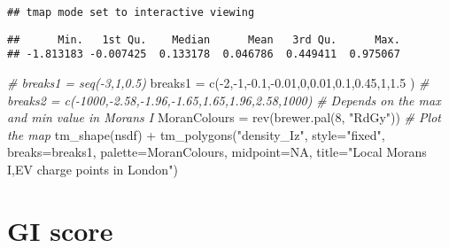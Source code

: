\documentclass[
]{book}
\newenvironment{Shaded}{\begin{snugshade}}{\end{snugshade}}
\newcommand{\AttributeTok}[1]{\textcolor[rgb]{0.77,0.63,0.00}{#1}}
\newcommand{\CommentTok}[1]{\textcolor[rgb]{0.56,0.35,0.01}{\textit{#1}}}
\newcommand{\ConstantTok}[1]{\textcolor[rgb]{0.00,0.00,0.00}{#1}}
\newcommand{\DecValTok}[1]{\textcolor[rgb]{0.00,0.00,0.81}{#1}}
\newcommand{\FloatTok}[1]{\textcolor[rgb]{0.00,0.00,0.81}{#1}}
\newcommand{\FunctionTok}[1]{\textcolor[rgb]{0.00,0.00,0.00}{#1}}
\newcommand{\NormalTok}[1]{#1}
\newcommand{\OtherTok}[1]{\textcolor[rgb]{0.56,0.35,0.01}{#1}}
\newcommand{\SpecialCharTok}[1]{\textcolor[rgb]{0.00,0.00,0.00}{#1}}
\newcommand{\StringTok}[1]{\textcolor[rgb]{0.31,0.60,0.02}{#1}}
\begin{document}
\begin{verbatim}
## tmap mode set to interactive viewing
\end{verbatim}

\begin{Shaded}
\end{Shaded}

\begin{verbatim}
##      Min.   1st Qu.    Median      Mean   3rd Qu.      Max. 
## -1.813183 -0.007425  0.133178  0.046786  0.449411  0.975067
\end{verbatim}

\begin{Shaded}
\begin{Highlighting}[]
\CommentTok{\# breaks1 = seq({-}3,1,0.5)}
\NormalTok{breaks1 }\OtherTok{=} \FunctionTok{c}\NormalTok{(}\SpecialCharTok{{-}}\DecValTok{2}\NormalTok{,}\SpecialCharTok{{-}}\DecValTok{1}\NormalTok{,}\SpecialCharTok{{-}}\FloatTok{0.1}\NormalTok{,}\SpecialCharTok{{-}}\FloatTok{0.01}\NormalTok{,}\DecValTok{0}\NormalTok{,}\FloatTok{0.01}\NormalTok{,}\FloatTok{0.1}\NormalTok{,}\FloatTok{0.45}\NormalTok{,}\DecValTok{1}\NormalTok{,}\FloatTok{1.5}\NormalTok{ ) }
\CommentTok{\# breaks2 = c({-}1000,{-}2.58,{-}1.96,{-}1.65,1.65,1.96,2.58,1000)}
\CommentTok{\# Depends on the max and min value in Moran\textquotesingle{}s I}
\NormalTok{MoranColours }\OtherTok{=} \FunctionTok{rev}\NormalTok{(}\FunctionTok{brewer.pal}\NormalTok{(}\DecValTok{8}\NormalTok{, }\StringTok{"RdGy"}\NormalTok{))}
\CommentTok{\# Plot the map}
\FunctionTok{tm\_shape}\NormalTok{(nsdf) }\SpecialCharTok{+}
  \FunctionTok{tm\_polygons}\NormalTok{(}\StringTok{"density\_Iz"}\NormalTok{,}
              \AttributeTok{style=}\StringTok{"fixed"}\NormalTok{,}
              \AttributeTok{breaks=}\NormalTok{breaks1,}
              \AttributeTok{palette=}\NormalTok{MoranColours,}
              \AttributeTok{midpoint=}\ConstantTok{NA}\NormalTok{,}
              \AttributeTok{title=}\StringTok{"Local Moran\textquotesingle{}s I,EV charge points in London"}\NormalTok{)}
\end{Highlighting}
\end{Shaded}

\hypertarget{htmlwidget-8c8d6a3296cbf651a9cf}{}

\hypertarget{gi-score}{%
\section{GI score}\label{gi-score}}
\end{document}
